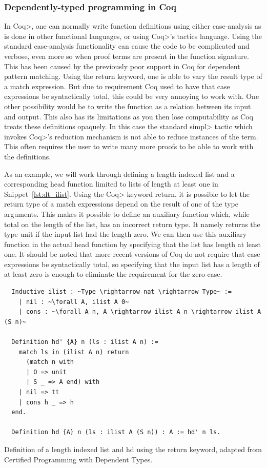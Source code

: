 \documentclass[11pt, final]{article}
\begin{document}

\subsubsection{Dependently-typed programming in Coq}

In \<Coq>, one can normally write function definitions using either case-analysis as is done in other functional languages, or using \<Coq>'s tactics language.
Using the standard case-analysis functionality can cause the code to be complicated and verbose, even more so when proof terms are present in the function signature.
This has been caused by the previously poor support in Coq for dependent pattern matching.
Using the return keyword, one is able to vary the result type of a match expression. But due to requirement Coq used to have that case expressions be syntactically total, this could be very annoying to work with.
One other possibility would be to write the function as a relation between its input and output.
This also has its limitations as you then lose computability as Coq treats these definitions opaquely. In this case the standard \<simpl> tactic which invokes \<Coq>'s reduction mechanism is not able to reduce instances of the term.
This often requires the user to write many more proofs to be able to work with the definitions.

As an example, we will work through defining a length indexed list and a corresponding head function limited to lists of length at least one in Snippet~\ref{lst:dt_ilist}.
Using the \<Coq> keyword return, it is possible to let the return type of a match expressions depend on the result of one of the type arguments.
This makes it possible to define an auxiliary function which, while total on the length of the list, has an incorrect return type. It namely returns the type unit if the input list had the length zero.
We can then use this auxiliary function in the actual head function by specifying that the list has length at least one.
It should be noted that more recent versions of Coq do not require that case expressions be syntactically total, so specifying that the input list has a length of at least zero is enough to eliminate the requirement for the zero-case.

\begin{listing}
  \begin{verbatim}
  Inductive ilist : ~Type \rightarrow nat \rightarrow Type~ :=
    | nil : ~\forall A, ilist A 0~
    | cons : ~\forall A n, A \rightarrow ilist A n \rightarrow ilist A (S n)~

  Definition hd' {A} n (ls : ilist A n) :=
    match ls in (ilist A n) return
      (match n with
      | O => unit
      | S _ => A end) with
    | nil => tt
    | cons h _ => h
  end.

  Definition hd {A} n (ls : ilist A (S n)) : A := hd' n ls.
  \end{verbatim}
  \caption{Definition of a length indexed list and hd using the return keyword, adapted from Certified Programming with Dependent Types\cite{ChlipalaCPDT}.}
  \label{lst:dt_ilist}
\end{listing}
\end{document}
